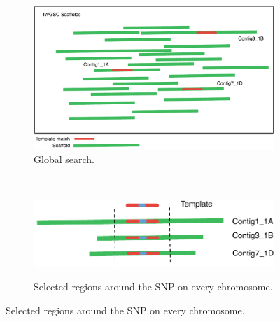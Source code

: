 \begin{figure}
    \centering
    \begin{subfigure}[b]{0.4\textwidth}
        \includegraphics[width=1\textwidth]{PolyMarker/Figures/alignment/scaffoldsSearch.pdf}
        \caption{Global search.}
        \label{fig:poly:globalSearch}
    \end{subfigure}
    ~ %
    \begin{subfigure}[b]{0.4\textwidth}
        \raisebox{10mm} { \includegraphics[width=1\textwidth]{PolyMarker/Figures/alignment/scaffoldsFoundAround.pdf} }
        \caption{Selected regions around the SNP on every chromosome.}
        \label{fig:poly:globalAround}
    \end{subfigure}
    

\end{figure}

